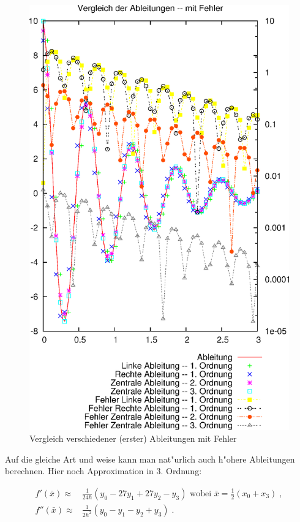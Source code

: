 \documentclass[a4paper]{book}
\begin{document}
\begin{figure}
  \centering
  \includegraphics[width=\textwidth, height=0.7\textheight]{./bilder/vgl-abl}
  \caption{Vergleich verschiedener (erster) Ableitungen mit Fehler}
  \label{fig:vlg-abl}
\end{figure}

Auf die gleiche Art und weise kann man nat"urlich auch h"ohere
Ableitungen berechnen. Hier noch Approximation in 3. Ordnung:

\begin{align*}
  f'(\bar x) \approx& \frac{1}{24h} (y_0 - 27y_1 + 27y_2 - y_3) \text{ wobei
  } \bar x = \frac{1}{2}(x_0 + x_3) \;, \\
  f''(\bar x) \approx& \frac{1}{2h^2} (y_0 - y_1 -y_2 + y_3 ) \;.
\end{align*}
\end{document}
